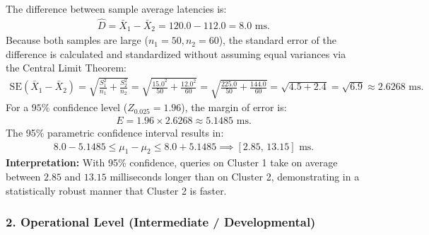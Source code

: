 \begin{solproblema}
	The difference between sample average latencies is:
	\begin{align}
		\hat{D} = \bar{X}_1 - \bar{X}_2 = 120.0 - 112.0 = 8.0 \text{ ms.}
	\end{align}
	Because both samples are large ($n_1 = 50, n_2 = 60$), the standard error of the difference is calculated and standardized without assuming equal variances via the Central Limit Theorem:
	\begin{align}
		\text{SE}(\bar{X}_1 - \bar{X}_2) = \sqrt{\frac{S_1^2}{n_1} + \frac{S_2^2}{n_2}} = \sqrt{\frac{15.0^2}{50} + \frac{12.0^2}{60}} = \sqrt{\frac{225.0}{50} + \frac{144.0}{60}} = \sqrt{4.5 + 2.4} = \sqrt{6.9} \approx 2.6268 \text{ ms.}
	\end{align}
	For a $95\%$ confidence level ($Z_{0.025} = 1.96$), the margin of error is:
	\begin{align}
		E = 1.96 \times 2.6268 \approx 5.1485 \text{ ms.}
	\end{align}
	The 95\% parametric confidence interval results in:
	\begin{align}
		8.0 - 5.1485 \le \mu_1 - \mu_2 \le 8.0 + 5.1485 \implies [2.85, \, 13.15] \text{ ms.}
	\end{align}
	\textbf{Interpretation:} With 95\% confidence, queries on Cluster 1 take on average between $2.85$ and $13.15$ milliseconds longer than on Cluster 2, demonstrating in a statistically robust manner that Cluster 2 is faster.
\end{solproblema}

\subsubsection*{2. Operational Level (Intermediate / Developmental)}


